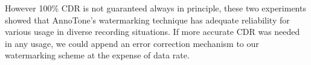 However 100\% CDR is not guaranteed always in principle, these two experiments showed that AnnoTone's watermarking technique has adequate reliability for various usage in diverse recording situations.
If more accurate CDR was needed in any usage, we could append an error correction mechanism to our watermarking scheme at the expense of data rate.
